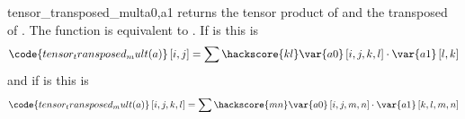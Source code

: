 \begin{funcdesc}{tensor_transposed_mult}{a0,a1}
returns the tensor product of  and the transposed of . 
The function is equivalent to
.
If  is \RankTwo this is
\begin{equation}
\code{tensor_transposed_mult(a)}\left[i,j\right]=\sum\hackscore{kl}\var{a0}\left[i,j,k,l\right] \cdot \var{a1} \left[l,k\right]
\end{equation} 
and if  is \RankFour this is
\begin{equation}
\code{tensor_transposed_mult(a)}\left[i,j,k,l\right]=\sum\hackscore{mn}\var{a0} \left[i,j,m,n\right] \cdot \var{a1} \left[k,l,m,n\right]
\end{equation} 
\end{funcdesc}

